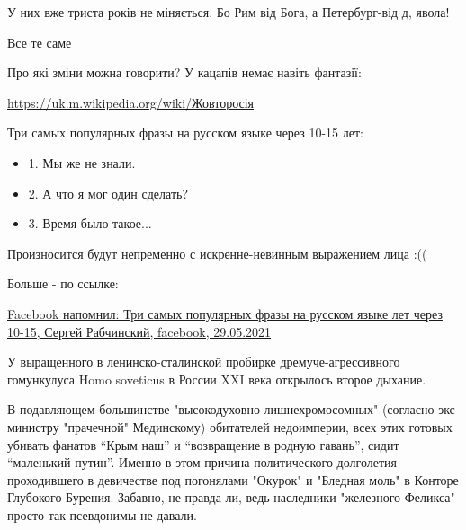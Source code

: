 \begin{itemize}
У них вже триста років не міняється. Бо Рим від Бога, а Петербург-від д, явола!

 
Все те саме

 
Про які зміни можна говорити? У кацапів немає навіть фантазії:

\url{https://uk.m.wikipedia.org/wiki/Жовторосія}


Три самых популярных фразы на русском языке через 10-15 лет:

\begin{itemize}
  \item 1. Мы же не знали.
  \item 2. А что я мог один сделать?
  \item 3. Время было такое...
\end{itemize}

Произносится будут непременно с искренне-невинным выражением лица :((

Больше - по ссылке: 

\href{https://www.facebook.com/100017678566688/posts/864723284126949/?d=n}{%
Facebook напомнил: Три самых популярных фразы на русском языке лет через 10-15, Сергей Рабчинский, %
facebook, 29.05.2021%
}

У выращенного в ленинско-сталинской пробирке дремуче-агрессивного гомункулуса
Homo soveticus в России XXI века открылось второе дыхание.

В подавляющем большинстве "высокодуховно-лишнехромосомных" (согласно
экс-министру "прачечной" Мединскому) обитателей недоимперии, всех этих готовых
убивать фанатов “Крым наш” и “возвращение в родную гавань”, сидит “маленький
путин”. Именно в этом причина политического долголетия проходившего в
девичестве под погонялами "Окурок" и "Бледная моль" в Конторе Глубокого
Бурения. Забавно, не правда ли, ведь наследники "железного Феликса" просто так
псевдонимы не давали.


\end{itemize}
